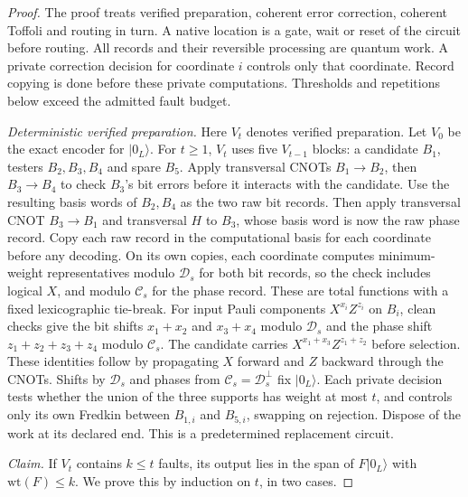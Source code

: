 \begin{proof}
The proof treats verified preparation, coherent error correction, coherent Toffoli and routing in turn. A native location is a gate, wait
or reset of the circuit before routing. All records and their reversible
processing are quantum work. A private correction decision for coordinate
\(i\) controls only that coordinate. Record copying is done before
these private computations. Thresholds and repetitions below exceed
the admitted fault budget.

\smallskip\noindent
\emph{Deterministic verified preparation.}
Here \(V_t\) denotes verified preparation. Let \(V_0\) be the exact encoder for \(|0_L\rangle\).
For \(t\ge1\), \(V_t\) uses five \(V_{t-1}\) blocks: a candidate
\(B_1\), testers \(B_2,B_3,B_4\) and spare \(B_5\).
Apply transversal CNOTs \(B_1\to B_2\), then \(B_3\to B_4\) to
check \(B_3\)'s bit errors before it interacts with the candidate.
Use the resulting basis words of \(B_2,B_4\) as the two raw bit
records. Then apply transversal CNOT \(B_3\to B_1\) and transversal
\(H\) to \(B_3\), whose basis word is now the raw phase record.
Copy each raw record in the computational basis for each coordinate
before any decoding. On its own copies, each coordinate computes
minimum-weight representatives modulo \(\mathcal D_s\) for both bit
records, so the check includes logical \(X\), and modulo
\(\mathcal C_s\) for the phase record. These are total functions with
a fixed lexicographic tie-break. For input Pauli components
\(X^{x_i}Z^{z_i}\) on \(B_i\), clean checks give the bit shifts
\(x_1+x_2\) and \(x_3+x_4\) modulo \(\mathcal D_s\) and the phase shift
\(z_1+z_2+z_3+z_4\) modulo \(\mathcal C_s\). The candidate carries
\(X^{x_1+x_3}Z^{z_1+z_2}\) before selection. These identities follow by
propagating \(X\) forward and \(Z\) backward through the CNOTs. Shifts
by \(\mathcal D_s\) and phases from \(\mathcal C_s=\mathcal D_s^\perp\)
fix \(|0_L\rangle\).
Each private decision tests whether the union of the three supports
has weight at most \(t\), and controls only its own Fredkin between
\(B_{1,i}\) and \(B_{5,i}\), swapping on rejection. Dispose of the work
at its declared end. This is a predetermined replacement circuit.

\emph{Claim.} If \(V_t\) contains \(k\le t\) faults, its output lies in the span of \(F|0_L\rangle\) with \(\mathrm{wt}(F)\le k\). We prove this by induction on \(t\), in two cases.


\end{proof}
